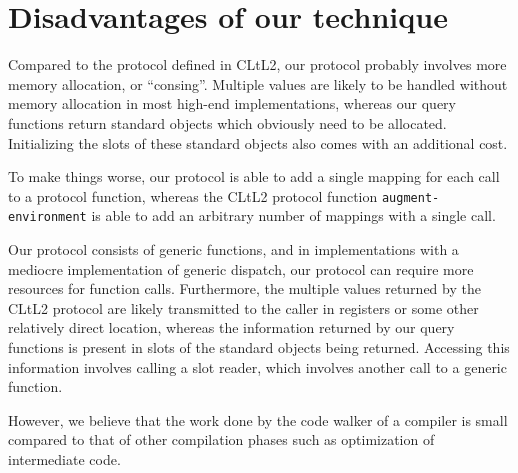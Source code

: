 \section{Disadvantages of our technique}
\label{disadvantages}

Compared to the protocol defined in CLtL2, our protocol probably
involves more memory allocation, or ``consing''.  Multiple values are
likely to be handled without memory allocation in most high-end
\commonlisp{} implementations, whereas our query functions return
standard objects which obviously need to be allocated.  Initializing
the slots of these standard objects also comes with an additional
cost.

To make things worse, our protocol is able to add a single mapping for
each call to a protocol function, whereas the CLtL2 protocol function
\texttt{augment-environment} is able to add an arbitrary number of
mappings with a single call.

Our protocol consists of generic functions, and in implementations
with a mediocre implementation of generic dispatch, our protocol can
require more resources for function calls.  Furthermore, the multiple
values returned by the CLtL2 protocol are likely transmitted to the
caller in registers or some other relatively direct location, whereas
the information returned by our query functions is present in slots of
the standard objects being returned.  Accessing this information
involves calling a slot reader, which involves another call to a
generic function.

However, we believe that the work done by the code walker of a
compiler is small compared to that of other compilation phases such as
optimization of intermediate code.
